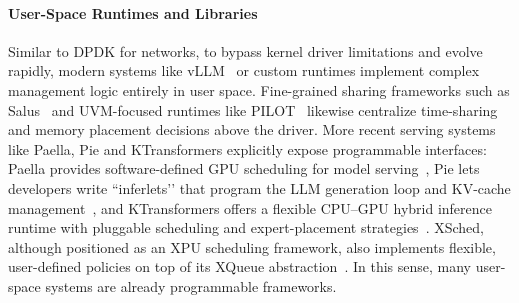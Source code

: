 \paragraph{User-Space Runtimes and Libraries}
Similar to DPDK for networks, to bypass kernel driver limitations and evolve
rapidly, modern systems like vLLM~\cite{kwon2023efficient} or custom runtimes
implement complex management logic entirely in user space. Fine-grained sharing
frameworks such as Salus~\cite{salus} and UVM-focused runtimes like
PILOT~\cite{pilot} likewise centralize time-sharing and memory placement
decisions above the driver. More recent serving systems like Paella, Pie and
KTransformers explicitly expose programmable interfaces: Paella provides
software-defined GPU scheduling for model serving~\cite{paella}, Pie lets
developers write “inferlets’’ that program the LLM generation loop and KV-cache
management~\cite{pie}, and KTransformers offers a flexible CPU–GPU hybrid
inference runtime with pluggable scheduling and expert-placement
strategies~\cite{ktransformers}. XSched, although positioned as an XPU
scheduling framework, also implements flexible, user-defined policies on top of
its XQueue abstraction~\cite{xsched}. In this sense, many user-space systems
are already programmable frameworks.

